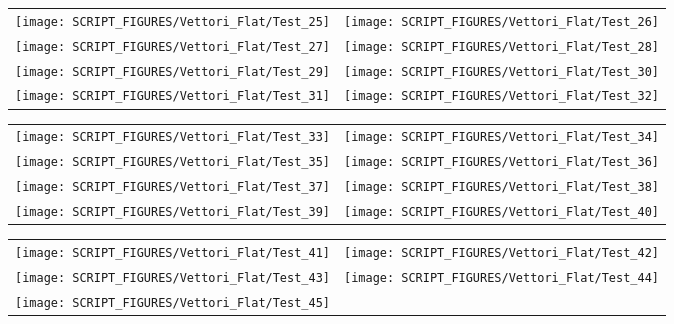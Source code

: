 \begin{figure}[p]
\begin{tabular*}{\textwidth}{l@{\extracolsep{\fill}}r}
\texttt{[image: SCRIPT\_FIGURES/Vettori\_Flat/Test\_25]} &
\texttt{[image: SCRIPT\_FIGURES/Vettori\_Flat/Test\_26]} \\
\texttt{[image: SCRIPT\_FIGURES/Vettori\_Flat/Test\_27]} &
\texttt{[image: SCRIPT\_FIGURES/Vettori\_Flat/Test\_28]} \\
\texttt{[image: SCRIPT\_FIGURES/Vettori\_Flat/Test\_29]} &
\texttt{[image: SCRIPT\_FIGURES/Vettori\_Flat/Test\_30]} \\
\texttt{[image: SCRIPT\_FIGURES/Vettori\_Flat/Test\_31]} &
\texttt{[image: SCRIPT\_FIGURES/Vettori\_Flat/Test\_32]} \\
\end{tabular*}
\label{Vettori_4}
\end{figure}

\begin{figure}[p]
\begin{tabular*}{\textwidth}{l@{\extracolsep{\fill}}r}
\texttt{[image: SCRIPT\_FIGURES/Vettori\_Flat/Test\_33]} &
\texttt{[image: SCRIPT\_FIGURES/Vettori\_Flat/Test\_34]} \\
\texttt{[image: SCRIPT\_FIGURES/Vettori\_Flat/Test\_35]} &
\texttt{[image: SCRIPT\_FIGURES/Vettori\_Flat/Test\_36]} \\
\texttt{[image: SCRIPT\_FIGURES/Vettori\_Flat/Test\_37]} &
\texttt{[image: SCRIPT\_FIGURES/Vettori\_Flat/Test\_38]} \\
\texttt{[image: SCRIPT\_FIGURES/Vettori\_Flat/Test\_39]} &
\texttt{[image: SCRIPT\_FIGURES/Vettori\_Flat/Test\_40]} \\
\end{tabular*}
\label{Vettori_5}
\end{figure}

\begin{figure}[p]
\begin{tabular*}{\textwidth}{l@{\extracolsep{\fill}}r}
\texttt{[image: SCRIPT\_FIGURES/Vettori\_Flat/Test\_41]} &
\texttt{[image: SCRIPT\_FIGURES/Vettori\_Flat/Test\_42]} \\
\texttt{[image: SCRIPT\_FIGURES/Vettori\_Flat/Test\_43]} &
\texttt{[image: SCRIPT\_FIGURES/Vettori\_Flat/Test\_44]} \\
\texttt{[image: SCRIPT\_FIGURES/Vettori\_Flat/Test\_45]} \\
\end{tabular*}
\label{Vettori_6}
\end{figure}


